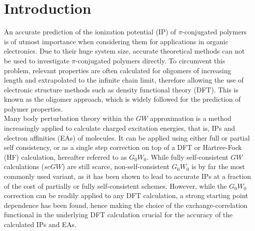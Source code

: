 \documentclass[journal=jctcce,manuscript=article,layout=twocolumn]{achemso}
\begin{document}
\section{Introduction}
An accurate prediction of the ionization potential (IP) of $\pi$-conjugated polymers is of utmost importance when considering them for applications in organic electronics. 
Due to their huge system size, accurate theoretical methods can not be used to investigate $\pi$-conjugated polymers directly. 
To circumvent this problem, relevant properties are often calculated for oligomers of increasing length and extrapolated to the infinite chain limit, therefore allowing the use of electronic structure methods such as density functional theory (DFT).
This is known as the oligomer approach, which is widely followed for the prediction of polymer properties.\cite{adv_mat_2007_opt_bandg,jpc_a_2012_rev_fits,acta_polym_1997_effective_conj_length}\\
Many body perturbation theory within the $GW$ approximation\cite{GW,GW_2,GW_3} is a method increasingly applied to calculate charged excitation energies, that is, IPs and electron affinities (EAs) of molecules.\cite{EPL2.298.2006,phys_rev_b_2011_gw_ip_organic,phys_rev_b_2012_gw_hierachy_results,GW100,GW100_planewave,GW100_scGW,PhysRevB.86.041110,PhysRevLett.86.472,PhysRevB.83.115123,j_phys_2017_GW_organic_semi,doi:10.1021/acs.jctc.5b01238} 
It can be applied using either full\cite{EPL2.298.2006,phys_rev_b_2010_gw_sc_on_dft,PhysRevB.90.085141,PhysRevB.86.081102,doi:10.1021/acs.jctc.5b01238} or partial\cite{GW_2,phys_rev_b_2011_gw_ip_organic,PhysRevB.83.115123, PhysRevLett.96.226402,PhysRevB.54.8411,doi:10.1021/acs.jctc.5b01238} self consistency, or as a single step 
correction on top of a DFT or Hartree-Fock (HF) calculation, hereafter referred to as $G_0W_0$. While fully self-consistent $GW$ calculations ($scGW$) are still scarce,
non-self-consistent $G_0W_0$ is by far the most commonly used variant, as it has been shown to lead to accurate IPs at a fraction of the cost of partially or fully self-consistent schemes.\cite{phys_rev_b_2010_gw_sc_on_dft,phys_rev_b_2012_gw_hierachy_results,phys_rev_b_2015_g0w0_tuning_polyacetylene}
However, while the $G_0W_0$ correction can be readily applied to any DFT calculation, a strong starting point dependence has been found,\cite{NJPhys_GW_OEP_Rinke_2005, PhysRevB.83.115123, PhysRevB.86.081102, PhysRevB.76.115109, phys_rev_b_2012_gw_hierachy_results, jctc_2013_gw_starting_points_benchmark, phys_rev_b_2011_gw_ip_organic, PhysRevB.86.041110,GW100,GW100_planewave,GW100_scGW,gallandi_koerzd_lrc_g0w0_2015,GW_acenes, jctc_2016_IP_III_GW_stuff,j_phys_2017_GW_organic_semi,phys_rev_b_2011_gw_copper,doi:10.1021/acs.jctc.5b01238} hence making the choice of the exchange-correlation functional in the underlying DFT calculation crucial for the accuracy of the calculated IPs and EAs.
\end{document}
